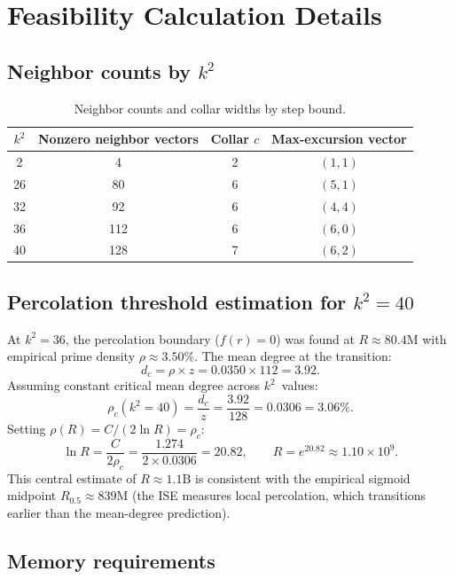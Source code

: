 \documentclass[11pt,a4paper]{article}
\newcommand{\fr}{f(r)}
\newcommand{\Rhalf}{R_{0.5}}
\theoremstyle{definition}
\theoremstyle{plain}
\theoremstyle{remark}
\begin{document}
\section{Feasibility Calculation Details}\label{app:feasibility}

\subsection{Neighbor counts by \texorpdfstring{$k^2$}{k\texttwosuperior}}

\begin{table}[ht]
\centering
\begin{tabular}{@{}cccc@{}}
\toprule
$k^2$ & Nonzero neighbor vectors & Collar $c$ & Max-excursion vector \\
\midrule
2  & 4   & 2 & $(1, 1)$ \\
26 & 80  & 6 & $(5, 1)$ \\
32 & 92  & 6 & $(4, 4)$ \\
36 & 112 & 6 & $(6, 0)$ \\
40 & 128 & 7 & $(6, 2)$ \\
\bottomrule
\end{tabular}
\caption{Neighbor counts and collar widths by step bound.}
\label{tab:neighbor-counts}
\end{table}

\subsection{Percolation threshold estimation for \texorpdfstring{$k^2 = 40$}{k\texttwosuperior\ = 40}}

At $k^2 = 36$, the percolation boundary ($\fr = 0$) was found at $R \approx 80.4\text{M}$ with empirical prime density $\rho \approx 3.50\%$.  The mean degree at the transition:
\[
  d_c = \rho \times z = 0.0350 \times 112 = 3.92.
\]
Assuming constant critical mean degree across $k^2$~values:
\[
  \rho_c(k^2 = 40) = \frac{d_c}{z} = \frac{3.92}{128} = 0.0306 = 3.06\%.
\]
Setting $\rho(R) = C / (2\ln R) = \rho_c$:
\[
  \ln R = \frac{C}{2\rho_c} = \frac{1.274}{2 \times 0.0306} = 20.82, \qquad R = e^{20.82} \approx 1.10 \times 10^9.
\]
This central estimate of $R \approx 1.1\text{B}$ is consistent with the empirical sigmoid midpoint $\Rhalf \approx 839\text{M}$ (the ISE measures local percolation, which transitions earlier than the mean-degree prediction).

\subsection{Memory requirements}
\end{document}
